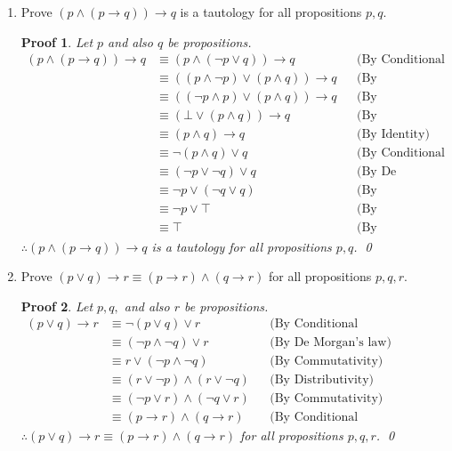 \documentclass[12pt]{article}
\newcommand{\T}{\top}
\newcommand{\F}{\bot}
\theoremstyle{proofstyle}
\newtheorem*{proof*}{Proof}
\begin{document}
\begin{enumerate}[left=0pt, itemsep=2em, parsep=1em]
\begin{enumerate}[label=(\alph*), itemsep=1.5em, leftmargin=2em]
\item
\begin{samepage}
Prove $(p \wedge (p \to q)) \to q$ is a tautology for all propositions $p, q$.

\begin{proof*}
Let $p$ and also $q$ be propositions.
\begin{align*}
(p \wedge (p \to q)) \to q &\equiv (p \wedge (\neg p \vee q)) \to q && \text{(By Conditional Disintegration)} \\
&\equiv ((p \wedge \neg p) \vee (p \wedge q)) \to q && \text{(By Distributivity)} \\
&\equiv ((\neg p \wedge p) \vee (p \wedge q)) \to q && \text{(By Commutativity)} \\
&\equiv (\F \vee (p \wedge q)) \to q && \text{(By Complement)} \\
&\equiv (p \wedge q) \to q && \text{(By Identity)} \\
&\equiv \neg(p \wedge q) \vee q && \text{(By Conditional Disintegration)} \\
&\equiv (\neg p \vee \neg q) \vee q && \text{(By De Morgan's law)} \\
&\equiv \neg p \vee (\neg q \vee q) && \text{(By Associativity)} \\
&\equiv \neg p \vee \T && \text{(By Complement)} \\
&\equiv \T && \text{(By Domination)}
\end{align*}
$\therefore (p \wedge (p \to q)) \to q$ is a tautology for all propositions $p, q$. \qed
\end{proof*}
\end{samepage}

\item Prove $(p \vee q) \to r \equiv (p \to r) \wedge (q \to r)$ for all propositions $p, q, r$.

\begin{proof*}
Let $p, q,$ and also $r$ be propositions.
\begin{align*}
(p \vee q) \to r &\equiv \neg (p \vee q) \vee r && \text{(By Conditional Disintegration)} \\
&\equiv (\neg p \wedge \neg q) \vee r && \text{(By De Morgan's law)}\\
&\equiv r \vee (\neg p \wedge \neg q) && \text{(By Commutativity)}\\
&\equiv (r \vee \neg p) \wedge ( r \vee \neg q) && \text{(By Distributivity)}\\
&\equiv (\neg p \vee r) \wedge (\neg q \vee r) && \text{(By Commutativity)}\\
&\equiv (p \to r) \wedge (q \to r) && \text{(By Conditional Disintegration)}
\end{align*}
$\therefore (p \vee q) \to r \equiv (p \to r) \wedge (q \to r)$ for all propositions $p, q, r$. \qed
\end{proof*}


\end{enumerate}
\end{enumerate}
\end{document}
